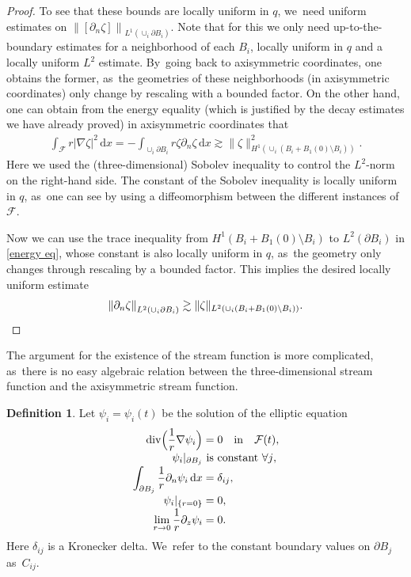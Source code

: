 \documentclass[10pt]{amsart}
\let\backslash\setminus
\theoremstyle{definition}
\newtheorem{definition}[theorem]{Definition}
\renewcommand{\div}{\operatorname{div}}
\newcommand\norm[1]{\left\lVert #1\right\rVert}
\newcommand\anorm[1]{\lVert #1\rVert}
\newcommand\eq{=}
\newcommand\dd{\,\mathrm{d}}
\newcommand\dx{\dd x}
\let\de\partial
\begin{document}
\begin{proof}
To see that these bounds are locally uniform in $q$, we~need uniform estimates on $\norm{[\de_n\zeta]}_{L^1(\cup_i\de B_i)}$. Note that for this we only need up-to-the-boundary estimates for a neighborhood of each $B_i$, locally uniform in $q$ and a locally uniform $L^2$ estimate. By~going back to axisymmetric coordinates, one obtains the former, as~the geometries of these neighborhoods (in axisymmetric coordinates) only change by rescaling with a bounded factor.
On the other hand, one can obtain from the energy equality (which is justified by the decay estimates we have already proved) in axisymmetric coordinates that
\begin{align}\label{energy eq}
\int_{\mathcal{F}} r|\nabla\zeta|^2\dx\eq -\int_{\cup_i \de B_i}r\zeta\de_n \zeta\dx\gtrsim \anorm{\zeta}_{H^1(\cup_i (B_i+B_1(0)\backslash B_i))}^2.
\end{align}
Here we used the (three-dimensional) Sobolev inequality to control the $L^2$-norm on the right-hand side. The constant of the Sobolev inequality is locally uniform in $q$, as~one can \eg see by using a diffeomorphism between the different instances of $\mathcal{F}$.

Now we can use the trace inequality from $H^1(B_i+B_1(0)\backslash B_i)$ to $L^2(\de B_i)$ in \eqref{energy eq}, whose constant is also locally uniform in $q$, as~the geometry only changes through rescaling by a bounded factor. This implies the desired locally uniform estimate
\[
\norm{\de_n\zeta}_{L^2(\cup_i\de B_i)}\gtrsim\anorm{\zeta}_{L^2(\cup_i (B_i+B_1(0)\backslash B_i))}.\qedhere
\]
\end{proof}

\begingroup

The argument for the existence of the stream function is more complicated, as~there is no easy algebraic relation between the three-dimensional stream function and the axisymmetric stream function.

\begin{definition}\label{def psi}
Let $\psi_{i}=\psi_i(t)$ be the solution of the elliptic equation
\begin{equation}
\label{Flow}
\begin{aligned}
\div\Bigl(\frac{1}{r}\nabla\psi_{i}\Bigr)&\eq0\quad \mathrm{ in }\quad\text{}\mathcal{F}(t),\\[-3pt]
\psi_{i}|_{\de B_j}&\text{ is constant $\forall j$},\\[-3pt]
\int_{\de B_j}\frac{1}{r}\de_{n}\psi_{i}\dx&\eq\delta_{ij},\\[-3pt]
\psi_i|_{\{r=0\}}&\eq0,\\[-3pt]
\lim_{r\to 0}\frac{1}{r}\de_z\psi_i&\eq 0.
\end{aligned}
\end{equation}
Here $\delta_{ij}$ is a Kronecker delta. We~refer to the constant boundary values on $\de B_j$ as~$C_{ij}$.
\end{definition}
\end{document}
